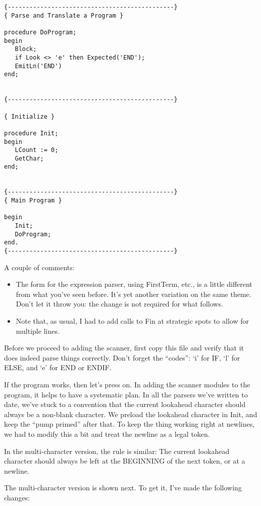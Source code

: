\begin{verbatim}
{----------------------------------------------}
{ Parse and Translate a Program }

procedure DoProgram;
begin
   Block;
   if Look <> 'e' then Expected('END');
   EmitLn('END')
end;


{----------------------------------------------}

{ Initialize }

procedure Init;
begin
   LCount := 0;
   GetChar;
end;


{----------------------------------------------}
{ Main Program }

begin
   Init;
   DoProgram;
end.
{----------------------------------------------}
\end{verbatim}

A couple of comments:

\begin{itemize}
\item	The form for the expression parser, using  FirstTerm, etc., is  a  little  different from what you've seen before. It's yet another variation on the same theme. Don't let it throw you: the change is not required for what follows.
\item	Note that, as usual, I had to add calls to Fin  at strategic spots to allow for multiple lines.
\end{itemize}

Before we proceed to adding the scanner, first copy this file and verify that it does indeed  parse things correctly. Don't forget the ``codes'': `i' for IF, `l' for ELSE, and `e' for END or ENDIF.

If the program works, then let's press on. In adding the scanner modules to the program, it helps  to  have a systematic plan. In all  the  parsers  we've  written  to  date, we've  stuck  to  a convention that the current lookahead character should  always be a non-blank character. We  preload  the  lookahead  character in Init, and keep the ``pump primed''  after  that. To keep the thing working right at newlines, we had to modify this a bit  and treat the newline as a legal token.

In the  multi-character version, the rule is similar: The current lookahead character should always be left at the BEGINNING of the next token, or at a newline.

The multi-character version is shown next. To get it, I've made the following changes:

